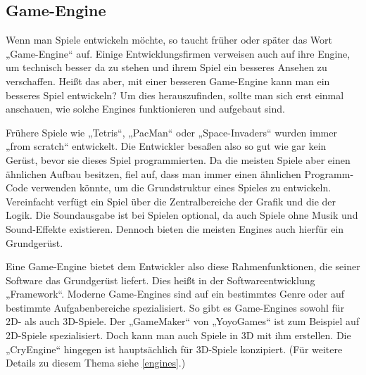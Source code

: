 \subsection{Game-Engine}	
\label{engine}
Wenn man Spiele entwickeln möchte, so taucht früher oder später das Wort „Game-Engine“ auf. Einige Entwicklungsfirmen verweisen auch auf ihre Engine, um technisch besser da zu stehen und ihrem Spiel ein besseres Ansehen zu verschaffen. Heißt das aber, mit einer besseren Game-Engine kann man ein besseres Spiel entwickeln? Um dies herauszufinden, sollte man sich erst einmal anschauen, wie solche Engines funktionieren und aufgebaut sind.

Frühere Spiele wie „Tetris“, „PacMan“ oder „Space-Invaders“ wurden immer „from scratch“  entwickelt. Die Entwickler besaßen also so gut wie gar kein Gerüst, bevor sie dieses Spiel programmierten. Da die meisten Spiele aber einen ähnlichen Aufbau besitzen, fiel auf, dass man immer einen ähnlichen Programm-Code verwenden könnte, um die Grundstruktur eines Spieles zu entwickeln. Vereinfacht verfügt ein Spiel über die Zentralbereiche der Grafik und die der Logik. Die Soundausgabe ist bei Spielen optional, da auch Spiele ohne Musik und Sound-Effekte existieren. Dennoch bieten die meisten Engines auch hierfür ein Grundgerüst.

Eine Game-Engine bietet dem Entwickler also diese Rahmenfunktionen, die seiner Software das Grundgerüst liefert. Dies heißt in der Softwareentwicklung „Framework“. 
Moderne Game-Engines sind auf ein bestimmtes Genre oder auf bestimmte Aufgabenbereiche spezialisiert. So gibt es Game-Engines sowohl für 2D- als auch 3D-Spiele. Der „GameMaker“ von „YoyoGames“ ist zum Beispiel auf 2D-Spiele spezialisiert. Doch kann man auch Spiele in 3D mit ihm erstellen. Die „CryEngine“ hingegen ist hauptsächlich für 3D-Spiele konzipiert. (Für weitere Details zu diesem Thema siehe \ref{engines}.)
